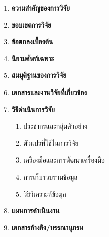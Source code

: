 \begin{titlepage}
\begin{enumerate}
    \item\textbf{ความสำคัญของการวิจัย}
    
    \lipsum[1-1]

    \item\textbf{ขอบเขตการวิจัย}
    
    \lipsum[1-1]

    \item\textbf{ข้อตกลงเบื้องต้น}
    
    \lipsum[1-1]

    \item\textbf{นิยามศัพท์เฉพาะ}
    
    \lipsum[1-1]

    \item\textbf{สมมุติฐานของการวิจัย}
    
    \lipsum[1-1]

    \item\textbf{เอกสารและงานวิจัยที่เกี่ยวข้อง}
    
    \lipsum[1-1]

    \item\textbf{วิธีดำเนินการวิจัย}
    
    \begin{enumerate}

      \item ประชากรและกลุ่มตัวอย่าง
      
      \lipsum[1-1]

      \item ตัวแปรที่ใช้ในการวิจัย
      
      \lipsum[1-1]

      \item เครื่องมือและการพัฒนาเครื่องมือ
      
      \lipsum[1-1]

      \item การเก็บรวบรวมข้อมูล
      
      \lipsum[1-1]

      \item วิธีวิเคราะห์ข้อมูล  
      
      \lipsum[1-1]

    \end{enumerate}
    \item\textbf{แผนการดำเนินงาน}
    
    \lipsum[1-3]

    \item\textbf{เอกสารอ้างอิง/บรรณานุกรม}
    
    \lipsum[1-4]


\end{enumerate}
\end{titlepage}
